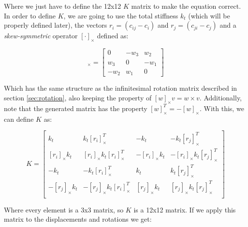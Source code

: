 Where we just have to define the 12x12 $K$ matrix to make the equation correct. In order 
to define $K$, we are going to use the total stiffness $k_t$ (which will be
properly defined later), the vectors $r_i = (c_{ij} - c_i)$ and $r_j = (c_{ji} - c_j)$
and a \textit{skew-symmetric} operator $[ \cdot ]_\times$ defined as:

\begin{equation}
    [w]_\times = \begin{bmatrix}
        0 & -w_3 & w_2 \\
        w_3 & 0 & -w_1 \\
        -w_2 & w_1 & 0 
    \end{bmatrix}
\end{equation}

Which has the same structure as the infinitesimal rotation matrix  
described in section \ref{sec:rotation}, also keeping the property 
of $[w]_\times v  = w \times v$. Additionally, note that the generated 
matrix has the property 
$[w]_\times^T = -[w]_\times$. With this, we can define $K$ as:

\begin{equation}
    K = \begin{bmatrix}
        k_t & k_t[r_i]_\times^T & -k_t & -k_t[r_j]_\times^T \\
        [r_i]_\times k_t & [r_i]_\times k_t [r_i]_\times^T & -[r_i]_\times k_t & -[r_i]_\times k_t [r_j]_\times^T \\
        -k_t & -k_t[r_i]_\times^T & k_t & k_t[r_j]_\times^T \\
        -[r_j]_\times k_t & -[r_j]_\times k_t [r_i]_\times^T & [r_j]_\times k_t & [r_j]_\times k_t [r_j]_\times^T \\
        
    \end{bmatrix}
\end{equation}

Where every element is a 3x3 matrix, so $K$ is a 12x12 matrix. If we apply this matrix 
to the displacements and rotations we get:

